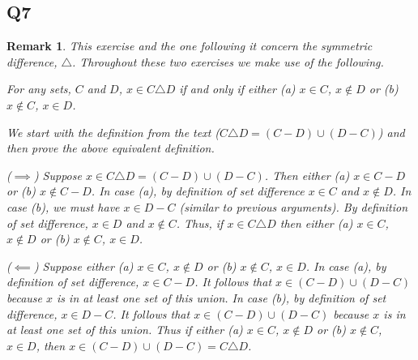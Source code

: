 \documentclass[12pt]{article}
\newtheorem{remark}{Remark}
\numberwithin{theorem}{section}
\numberwithin{equation}{section}
\numberwithin{remark}{section}
\numberwithin{definition}{section}
\numberwithin{theorem}{section}
\numberwithin{lemma}{section}
\numberwithin{example}{section}
\begin{document}
\subsection{Q7}

\begin{remark}
	This exercise and the one following it concern the symmetric difference, $\triangle$. Throughout these two exercises we make use of the following. 
	\begin{center}
		For any sets, $C$ and $D$, $x\in C \triangle D$ if and only if either (a) $x\in C$, $x\notin D$ or (b) $x\notin C$, $x\in D$.
	\end{center}
	We start with the definition from the text ($C \triangle D = (C-D)\cup(D-C)$) and then prove the above equivalent definition. 
	
	\vspace{\baselineskip}
	
	\noindent ($\implies$) Suppose $x \in C \triangle D = (C-D)\cup(D-C)$. Then either (a) $x\in C-D$ or (b) $x\notin C-D$. In case (a), by definition of set difference $x\in C$ and $x\notin D$. In case (b), we must have $x\in D-C$ (similar to previous arguments). By definition of set difference, $x\in D$ and $x\notin C$. Thus, if $x\in C \triangle D$ then either (a) $x\in C$, $x\notin D$ or (b) $x\notin C$, $x\in D$.
	
	\vspace{\baselineskip}
	
	\noindent ($\impliedby$) Suppose either (a) $x\in C$, $x\notin D$ or (b) $x\notin C$, $x\in D$. In case (a), by definition of set difference, $x\in C - D$. It follows that $x \in (C - D) \cup (D - C)$ because $x$ is in at least one set of this union. In case (b), by definition of set difference, $x \in D - C$. It follows that $x \in (C - D) \cup (D - C)$ because $x$ is in at least one set of this union. Thus if either (a) $x\in C$, $x\notin D$ or (b) $x\notin C$, $x\in D$, then $x\in (C - D) \cup (D - C) = C \triangle D$. 
	
\end{remark} 
\end{document}
